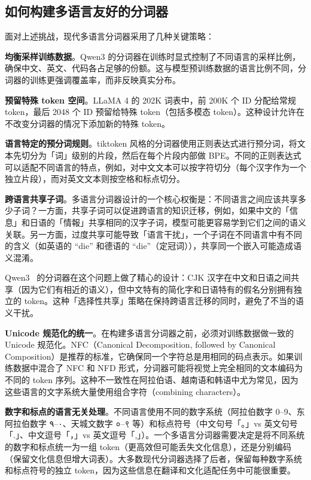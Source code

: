 \subsection{如何构建多语言友好的分词器}

面对上述挑战，现代多语言分词器采用了几种关键策略：

\textbf{均衡采样训练数据}。Qwen3 的分词器在训练时显式控制了不同语言的采样比例，确保中文、英文、代码各占足够的份额。这与模型预训练数据的语言比例不同，分词器的训练更强调覆盖率，而非反映真实分布。

\textbf{预留特殊 token 空间}。LLaMA 4 的 202K 词表中，前 200K 个 ID 分配给常规 token，最后 2048 个 ID 预留给特殊 token（包括多模态 token）。这种设计允许在不改变分词器的情况下添加新的特殊 token。

\textbf{语言特定的预分词规则}。tiktoken 风格的分词器使用正则表达式进行预分词，将文本先切分为「词」级别的片段，然后在每个片段内部做 BPE。不同的正则表达式可以适配不同语言的特点，例如，对中文文本可以按字符切分（每个汉字作为一个独立片段），而对英文文本则按空格和标点切分。

\textbf{跨语言共享子词}。多语言分词器设计的一个核心权衡是：不同语言之间应该共享多少子词？一方面，共享子词可以促进跨语言的知识迁移，例如，如果中文的「信息」和日语的「情報」共享相同的汉字子词，模型可能更容易学到它们之间的语义关联。另一方面，过度共享可能导致「语言干扰」，一个子词在不同语言中有不同的含义（如英语的 “die” 和德语的 “die”（定冠词）），共享同一个嵌入可能造成语义混淆。

Qwen3~\cite{qwen2025qwen3} 的分词器在这个问题上做了精心的设计：CJK 汉字在中文和日语之间共享（因为它们有相近的语义），但中文特有的简化字和日语特有的假名分别拥有独立的 token。这种「选择性共享」策略在保持跨语言迁移的同时，避免了不当的语义干扰。

\textbf{Unicode 规范化的统一}。在构建多语言分词器之前，必须对训练数据做一致的 Unicode 规范化。NFC（Canonical Decomposition, followed by Canonical Composition）是推荐的标准，它确保同一个字符总是用相同的码点表示。如果训练数据中混合了 NFC 和 NFD 形式，分词器可能将视觉上完全相同的文本编码为不同的 token 序列。这种不一致性在阿拉伯语、越南语和韩语中尤为常见，因为这些语言的文字系统大量使用组合字符（combining characters）。

\textbf{数字和标点的语言无关处理}。不同语言使用不同的数字系统（阿拉伯数字 0--9、东阿拉伯数字 ٠--٩、天城文数字 ०--९ 等）和标点符号（中文句号「。」vs 英文句号「.」、中文逗号「，」vs 英文逗号「,」）。一个多语言分词器需要决定是将不同系统的数字和标点统一为一组 token（更高效但可能丢失文化信息），还是分别编码（保留文化信息但增大词表）。大多数现代分词器选择了后者，保留每种数字系统和标点符号的独立 token，因为这些信息在翻译和文化适配任务中可能很重要。

